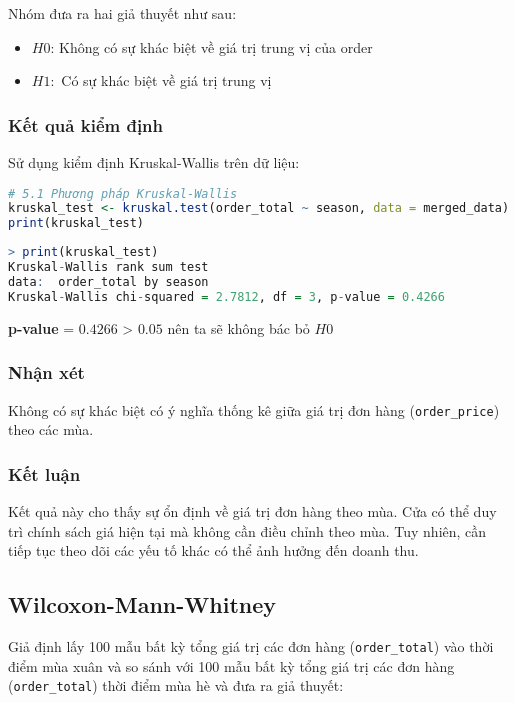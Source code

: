 Nhóm đưa ra hai giả thuyết như sau:
\begin{itemize}
    \item $H0$: Không có sự khác biệt về giá trị trung vị của order
    \item $H1:$ Có sự khác biệt về giá trị trung vị
\end{itemize}

\subsubsection{Kết quả kiểm định}
Sử dụng kiểm định Kruskal-Wallis trên dữ liệu:
\begin{lstlisting}[language=R, caption=Kruskal-Wallis trong R]
# 5.1 Phương pháp Kruskal-Wallis
kruskal_test <- kruskal.test(order_total ~ season, data = merged_data)
print(kruskal_test)
\end{lstlisting}
\begin{lstlisting}[language=R,caption=Kết quả Kruskal test]
> print(kruskal_test)
Kruskal-Wallis rank sum test
data:  order_total by season
Kruskal-Wallis chi-squared = 2.7812, df = 3, p-value = 0.4266
\end{lstlisting}
\begin{boxH}
\textbf{p-value} = $0.4266$ > $0.05$ nên ta sẽ không bác bỏ $H0$
\end{boxH}

\subsubsection{Nhận xét}
Không có sự khác biệt có ý nghĩa thống kê giữa giá trị đơn hàng (\texttt{order\_price}) theo các mùa.  

\subsubsection{Kết luận}
Kết quả này cho thấy sự ổn định về giá trị đơn hàng theo mùa. Cửa có thể duy trì chính sách giá hiện tại mà không cần điều chỉnh theo mùa. Tuy nhiên, cần tiếp tục theo dõi các yếu tố khác có thể ảnh hưởng đến doanh thu.


\subsection{Wilcoxon-Mann-Whitney}
Giả định lấy 100 mẫu bất kỳ tổng giá trị các đơn hàng (\texttt{order\_total}) vào thời điểm mùa xuân và so sánh với 100 mẫu bất kỳ tổng giá trị các đơn hàng (\texttt{order\_total}) thời điểm mùa hè và đưa ra giả thuyết:
